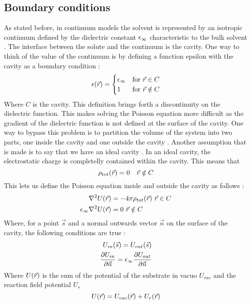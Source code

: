 \documentclass[../master_thesis.tex]{subfiles}
\begin{document}
\subsection{Boundary conditions}
As stated before, in continuum models the solvent is represented by an isotropic
continuum defined by the dielectric constant $\epsilon_{\infty}$ characteristic to the bulk
solvent \cite{Tomasi:1994wt}. The interface between the solute and the continuum
is the cavity. One way to think of the value of the continuum is by defining a
function epsilon with the cavity as a boundary condition \cite{Tomasi:2005ipa, Tomasi:1994wt}:
\begin{equation}
  \epsilon(\vec{r}) =
  \begin{cases}
  \epsilon_{\infty} & \text{for} \ \vec{r}\in C\\
  1 & \text{for}\ \vec{r} \notin C
\end{cases}
\end{equation}
Where $C$ is the cavity. This definition brings forth a discontinuity on the
dielectric function. This makes solving the Poisson equation more difficult as
the gradient of the dielectric function is not defined at the surface of the
cavity. One way to bypass this problem is to partition the volume of the system
into two parts, one inside the cavity and one outside the cavity \cite{Tomasi:1994wt}.
Another assumption that is made is to say that we have an ideal cavity
\cite{Cramer:2004, Tomasi:1994wt}. In an ideal cavity, the electrostatic charge
is completelly contained within the cavity. This means that \cite{Tomasi:1994wt}
\begin{equation}
  \rho_{\mathrm{tot}}(\vec{r})=0 \quad \vec{r} \notin C
\end{equation}
This lets us define the Poisson equation inside and outside the cavity as follows
\cite{Sorland, Tomasi:1994wt}:
\begin{align}
  \begin{split}
    \nabla^2U(\vec{r}) &= -4\pi\rho_{tot}(\vec{r})\ \vec{r}\in C\\
    \epsilon_{\infty}\nabla^2U(\vec{r}) &= 0 \ \vec{r} \notin C
  \end{split}
\end{align}
Where, for a point $\vec{s}$ and a normal outwards vector $\vec{n}$ on the
surface of the cavity, the following conditions are true
\cite{Sorland, Tomasi:1994wt}:
\begin{align}
  \begin{split}
    U_{in}(\vec{s}) = U_{out}(\vec{s})\\
    \frac{\partial U_{in}}{\partial\vec{n}} = \epsilon_{\infty}\frac{\partial U_{out}}{\partial\vec{n}}
  \end{split}
\end{align}
Where $U(\vec{r})$ is the sum of the potential of the substrate in vacuo
$U_{vac}$ and the reaction field potential $U_r$\cite{Sorland, FossoTande:2013ka}
\begin{equation}\label{eq:Utot}
  U(\vec{r}) = U_{vac}(\vec{r}) + U_r(\vec{r})
\end{equation}
\end{document}
